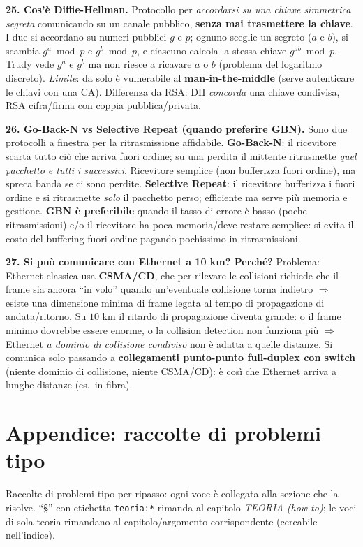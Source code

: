 \documentclass[11pt,a4paper]{report}
\begin{document}
\textbf{25. Cos'è Diffie-Hellman.} Protocollo per \emph{accordarsi su una chiave
simmetrica segreta} comunicando su un canale pubblico, \textbf{senza mai
trasmettere la chiave}. I due si accordano su numeri pubblici $g$ e $p$; ognuno
sceglie un segreto ($a$ e $b$), si scambia $g^a\!\bmod p$ e $g^b\!\bmod p$, e
ciascuno calcola la stessa chiave $g^{ab}\!\bmod p$. Trudy vede $g^a$ e $g^b$ ma
non riesce a ricavare $a$ o $b$ (problema del logaritmo discreto). \emph{Limite}:
da solo è vulnerabile al \textbf{man-in-the-middle} (serve autenticare le chiavi
con una CA). Differenza da RSA: DH \emph{concorda} una chiave condivisa, RSA
cifra/firma con coppia pubblica/privata.

\textbf{26. Go-Back-N vs Selective Repeat (quando preferire GBN).} Sono due
protocolli a finestra per la ritrasmissione affidabile. \textbf{Go-Back-N}: il
ricevitore scarta tutto ciò che arriva fuori ordine; su una perdita il mittente
ritrasmette \emph{quel pacchetto e tutti i successivi}. Ricevitore semplice (non
bufferizza fuori ordine), ma spreca banda se ci sono perdite. \textbf{Selective
Repeat}: il ricevitore bufferizza i fuori ordine e si ritrasmette \emph{solo} il
pacchetto perso; efficiente ma serve più memoria e gestione. \textbf{GBN è
preferibile} quando il tasso di errore è basso (poche ritrasmissioni) e/o il
ricevitore ha poca memoria/deve restare semplice: si evita il costo del
buffering fuori ordine pagando pochissimo in ritrasmissioni.

\textbf{27. Si può comunicare con Ethernet a 10 km? Perché?} Problema: Ethernet
classica usa \textbf{CSMA/CD}, che per rilevare le collisioni richiede che il
frame sia ancora ``in volo'' quando un'eventuale collisione torna indietro
$\Rightarrow$ esiste una dimensione minima di frame legata al tempo di
propagazione di andata/ritorno. Su $10$ km il ritardo di propagazione diventa
grande: o il frame minimo dovrebbe essere enorme, o la collision detection non
funziona più $\Rightarrow$ Ethernet \emph{a dominio di collisione condiviso} non
è adatta a quelle distanze. Si comunica solo passando a \textbf{collegamenti
punto-punto full-duplex con switch} (niente dominio di collisione, niente
CSMA/CD): è così che Ethernet arriva a lunghe distanze (es.\ in fibra).

\chapter{Appendice: raccolte di problemi tipo}
Raccolte di problemi tipo per ripasso: ogni voce è collegata alla sezione che la
risolve. ``\S'' con etichetta \texttt{teoria:*} rimanda al capitolo \emph{TEORIA (how-to)}; le
voci di sola teoria rimandano al capitolo/argomento corrispondente (cercabile
nell'indice).
\end{document}
